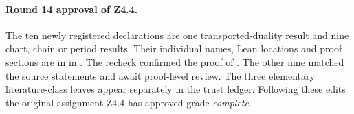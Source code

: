 \paragraph{Round 14 approval of Z4.4.}\label{r14:z44-approved}
The ten newly registered declarations are one transported-duality result
and nine chart, chain or period results. Their individual names, Lean
locations and proof sections are in  in
. The recheck confirmed the proof of .
The other nine matched the source statements and await proof-level review.
The three elementary literature-class leaves appear separately in the
trust ledger. Following these edits the original assignment Z4.4 has
approved grade \emph{complete}.

